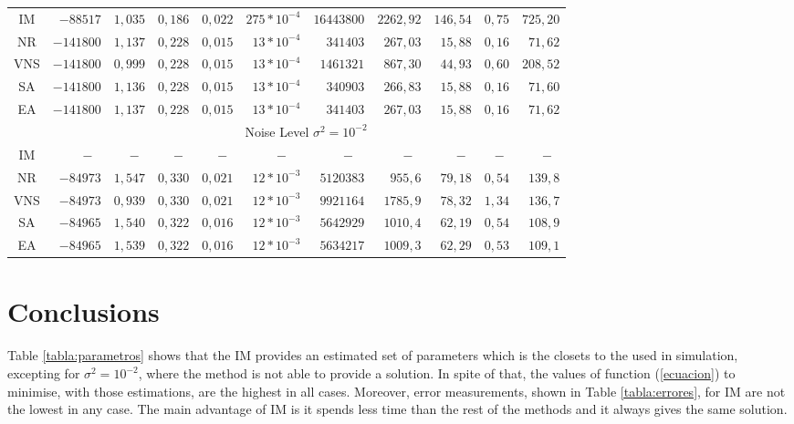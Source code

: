 \documentclass{sig-alternate}
\begin{document}
\begin{table*}
\begin{center}
{\begin{tabular}{c|rrrrr|rrrrr}
\hline
 			IM&$-88517$	&$1,035$	&$0,186$	&$0,022$	&$275*10^{-4}$ 	&$16443800$	&$2262,92$ 	&$146,54$	&$0,75$		&$725,20$	\\
 			NR&$-141800$	&$1,137$	&$0,228$	&$0,015$	&$13*10^{-4}$ &$341403$		&$267,03$	&$15,88$	&$0,16$		&$71,62$	\\
           VNS &$-141800$	&$0,999$	&$0,228$	&$0,015$	&$13*10^{-4}$	&$1461321$	&$867,30$ 	&$44,93$	&$0,60$		&$208,52$	\\
 			SA &$-141800$	&$1,136$	&$0,228$	&$0,015$	&$13*10^{-4}$	&$340903$		&$266,83$	&$15,88$	&$0,16$		&$71,60$	\\
 			EA &$-141800$	&$1,137$	&$0,228$	&$0,015$	&$13*10^{-4}$	&$341403$		&$267,03$	&$15,88$	&$0,16$		&$71,62$	\\
\hline
\hline
&\multicolumn{10}{c}{Noise Level $\sigma^2=  10^{-2}$} \\
\hline
 			IM 	&$-\ \ \ $				& $-\ \ $ 		&$-\ \ $		&$-\ \ $		& $-\ \ \ \ \ $		& $-\ \ \ \ $		&$-\ \ \ $		&$-\ \ $		 &$-\ \,$		&$-\ \ \,$\\
 			NR&$-84973$	&$1,547$	&$0,330$	&$0,021$	&$12*10^{-3}$ &$5120383$			&$955,6$	&$79,18$	&$0,54$		& $139,8$	\\
            VNS&$-84973$	&$0,939$	&$0,330$	&$0,021$	&$12*10^{-3}$	&$9921164$	& $1785,9$ 	&$78,32$	&$1,34$		& $136,7$	\\
 			SA &$-84965$	&$1,540$	&$0,322$	&$0,016$	&$12*10^{-3}$	&$5642929$			&$1010,4$	&$62,19$	&$0,54$	&$108,9$	\\
 			EA &$-84965$	&$1,539$	&$0,322$	&$0,016$	&$12*10^{-3}$	&$5634217$		&$1009,3$	&$62,29$	&$0,53$	&$109,1$	\\
\hline
\end{tabular}
}
\label{tabla:errores}\end{center}
\end{table*}

\section{Conclusions}
\label{sec:Conclusion}

Table \ref{tabla:parametros} shows that the IM provides an estimated set of parameters which is the closets to the used in simulation, excepting for $\sigma^2=10^{-2}$, where the method is not able to provide a solution. In spite of that, the values of function (\ref{ecuacion}) to minimise, with those estimations, are the highest in all cases. Moreover, error measurements, shown in Table \ref{tabla:errores}, for IM are not the lowest in any case. The main advantage of IM is it spends less time than the rest of the methods and it always gives the same solution.
\end{document}

